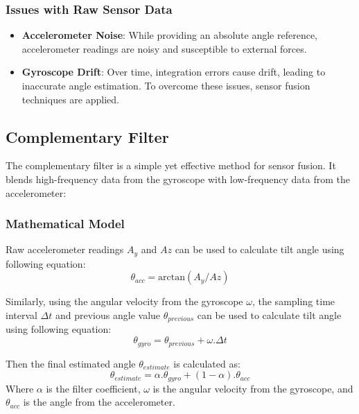 \subsubsection{Issues with Raw Sensor Data}
\begin{itemize}
\item \textbf{Accelerometer Noise}: While providing an absolute angle reference, accelerometer readings are noisy and susceptible to external forces.
\item \textbf{Gyroscope Drift}: Over time, integration errors cause drift, leading to inaccurate angle estimation.
To overcome these issues, sensor fusion techniques are applied.
\end{itemize}


\subsection{Complementary Filter}
The complementary filter is a simple yet effective method for sensor fusion. It blends high-frequency data from the gyroscope with low-frequency data from the accelerometer:

\subsubsection{Mathematical Model}
Raw accelerometer readings $A_y$ and $Az$ can be used to calculate tilt angle using following equation:
$$
\theta_{acc} = \text{arctan} \left(A_y/Az  \right) 
$$

Similarly, using the angular velocity from the gyroscope $\omega$, the sampling time interval $\Delta t$ and previous angle value $\theta_{previous}$ can be used to calculate tilt angle using following equation:
$$
\theta_{gyro} = \theta_{previous} + \omega . \Delta t
$$

Then the final estimated angle $\theta_{estimate}$ is calculated as:
\begin{equation}
	\theta_{estimate} = \alpha . \theta_{gyro} + (1 - \alpha) . \theta_{acc}
\end{equation}
Where $\alpha$ is the filter coefficient, $\omega$ is the angular velocity from the gyroscope, and $\theta_{acc}$ is the angle from the accelerometer.

